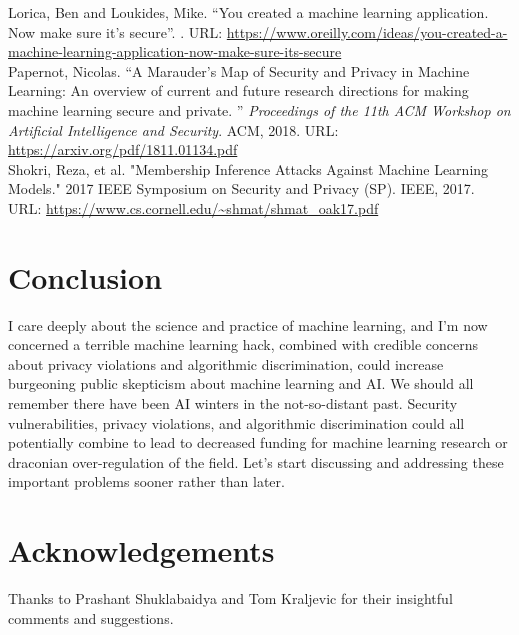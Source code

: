 \documentclass[fleqn]{article}
\begin{document}
\noindent Lorica, Ben and Loukides, Mike. ``You created a machine learning application. Now make sure it’s secure''. . URL: \url{https://www.oreilly.com/ideas/you-created-a-machine-learning-application-now-make-sure-its-secure}\\

\noindent Papernot, Nicolas. ``A Marauder's Map of Security and Privacy in Machine Learning: An overview of current and future research directions for making machine learning secure and private. '' \textit{Proceedings of the 11th ACM Workshop on Artificial Intelligence and Security}. ACM, 2018. URL: \url{https://arxiv.org/pdf/1811.01134.pdf}\\

\noindent Shokri, Reza, et al. "Membership Inference Attacks Against Machine Learning Models." 2017 IEEE Symposium on Security and Privacy (SP). IEEE, 2017. URL: \url{https://www.cs.cornell.edu/~shmat/shmat_oak17.pdf}


\section*{Conclusion}

I care deeply about the science and practice of machine learning, and I'm now concerned a terrible machine learning hack, combined with credible concerns about privacy violations and algorithmic discrimination, could increase burgeoning public skepticism about machine learning and AI. We should all remember there have been AI winters in the not-so-distant past. Security vulnerabilities, privacy violations, and algorithmic discrimination could all potentially combine to lead to decreased funding for machine learning research or draconian over-regulation of the field. Let's start discussing and addressing these important problems sooner rather than later.

\section*{Acknowledgements}

Thanks to Prashant Shuklabaidya and Tom Kraljevic for their insightful comments and suggestions.
\end{document}
